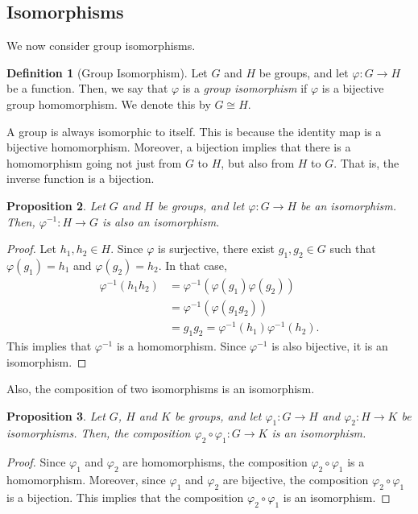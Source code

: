 \documentclass[a4paper, openany]{memoir}
\theoremstyle{definition}
\newtheorem{definition}{Definition}[section]
\theoremstyle{plain}
\newtheorem{proposition}[definition]{Proposition}
\begin{document}
\subsection{Isomorphisms}
We now consider group isomorphisms.
\begin{definition}[Group Isomorphism]
Let $G$ and $H$ be groups, and let $\varphi: G \to H$ be a function. Then, we say that $\varphi$ is a \emph{group isomorphism} if $\varphi$ is a bijective group homomorphism. We denote this by $G \cong H$.
\end{definition}
\noindent A group is always isomorphic to itself. This is because the identity map is a bijective homomorphism. Moreover, a bijection implies that there is a homomorphism going not just from $G$ to $H$, but also from $H$ to $G$. That is, the inverse function is a bijection.
\begin{proposition}
Let $G$ and $H$ be groups, and let $\varphi: G \to H$ be an isomorphism. Then, $\varphi^{-1}: H \to G$ is also an isomorphism.
\end{proposition}
\begin{proof}
Let $h_1, h_2 \in H$. Since $\varphi$ is surjective, there exist $g_1, g_2 \in G$ such that $\varphi(g_1) = h_1$ and $\varphi(g_2) = h_2$. In that case,
\begin{align*}
    \varphi^{-1}(h_1 h_2) &= \varphi^{-1}(\varphi(g_1) \varphi(g_2)) \\
    &= \varphi^{-1}(\varphi(g_1 g_2)) \\
    &= g_1 g_2 = \varphi^{-1}(h_1) \varphi^{-1}(h_2).
\end{align*}
This implies that $\varphi^{-1}$ is a homomorphism. Since $\varphi^{-1}$ is also bijective, it is an isomorphism.
\end{proof}
\noindent Also, the composition of two isomorphisms is an isomorphism.
\begin{proposition}
Let $G$, $H$ and $K$ be groups, and let $\varphi_1: G \to H$ and $\varphi_2: H \to K$ be isomorphisms. Then, the composition $\varphi_2 \circ \varphi_1: G \to K$ is an isomorphism.
\end{proposition}
\begin{proof}
Since $\varphi_1$ and $\varphi_2$ are homomorphisms, the composition $\varphi_2 \circ \varphi_1$ is a homomorphism. Moreover, since $\varphi_1$ and $\varphi_2$ are bijective, the composition $\varphi_2 \circ \varphi_1$ is a bijection. This implies that the composition $\varphi_2 \circ \varphi_1$ is an isomorphism.
\end{proof}
\end{document}
